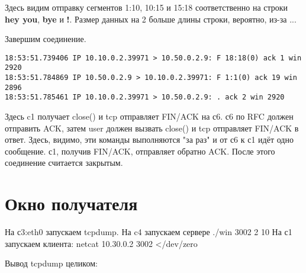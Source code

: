 \documentclass[a4paper,12pt]{article}
\begin{document}
Здесь видим отправку сегментов 1:10, 10:15 и 15:18 соответственно на строки \textbf{hey you}, \textbf{bye} и \textbf{!}. 
Размер данных на 2 больше длины строки, вероятно, из-за ... 

\vspace*{\baselineskip}
Завершим соединение.
\begin{Verbatim}
18:53:51.739406 IP 10.10.0.2.39971 > 10.50.0.2.9: F 18:18(0) ack 1 win 2920
18:53:51.784869 IP 10.50.0.2.9 > 10.10.0.2.39971: F 1:1(0) ack 19 win 2896 
18:53:51.785461 IP 10.10.0.2.39971 > 10.50.0.2.9: . ack 2 win 2920
\end{Verbatim}

Здесь c1 получает close() и tcp отправляет FIN/ACK на с6.
с6 по RFC должен отправить ACK, затем user должен вызвать close() и tcp отправляет FIN/ACK в ответ.
Здесь, видимо, эти команды выполняются "за раз" и от с6 к с1 идёт одно сообщение.
с1, получив FIN/ACK, отправляет обратно ACK. После этого соединение считается закрытым.


\section{Окно получателя}

На с3:eth0 запускаем tcpdump. 
На c4 запускаем сервере ./win 3002 2 10
На с1 запускаем клиента: netcat 10.30.0.2 3002 </dev/zero

Вывод tcpdump целиком:
\end{document}
